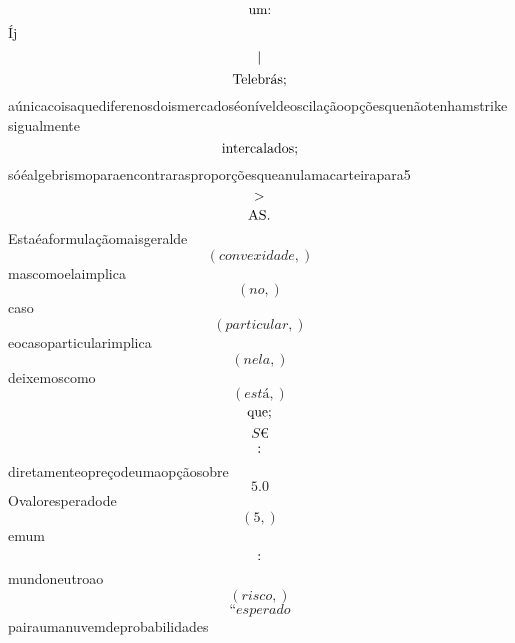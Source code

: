 \documentclass{article}
\begin{document}
\begin{equation}
$um:$
\end{equation}Íj\begin{equation}
$|$
\end{equation}\begin{equation}
$Telebrás;$
\end{equation}aúnicacoisaquediferenosdoismercadoséoníveldeoscilaçãoopçõesquenãotenhamstrikesigualmente\begin{equation}
$intercalados;$
\end{equation}sóéalgebrismoparaencontrarasproporçõesqueanulamacarteirapara5\begin{equation}
$>$
\end{equation}\begin{equation}
$AS.$
\end{equation}Estaéaformulaçãomaisgeralde\begin{equation}
\left( convexidade,\right)
\end{equation}mascomoelaimplica\begin{equation}
\left( no,\right)
\end{equation}caso\begin{equation}
\left( particular,\right)
\end{equation}eocasoparticularimplica\begin{equation}
\left( nela,\right)
\end{equation}deixemoscomo\begin{equation}
\left( está,\right)
\end{equation}\begin{equation}
$que;$
\end{equation}\begin{equation}
S€
\end{equation}\begin{equation}
$:$
\end{equation}diretamenteopreçodeumaopçãosobre\begin{equation}
5.0
\end{equation}Ovaloresperadode\begin{equation}
\left( 5,\right)
\end{equation}emum\begin{equation}
$:$
\end{equation}mundoneutroao\begin{equation}
\left( risco,\right)
\end{equation}\begin{equation}
“esperado
\end{equation}pairaumanuvemdeprobabilidades\begin{equation}

\end{equation}
\end{document}
